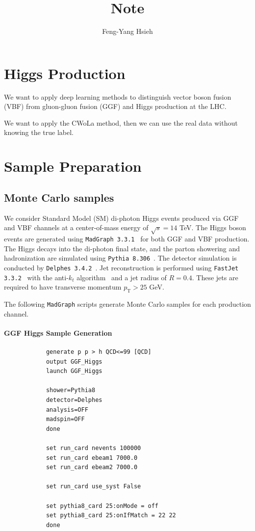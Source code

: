 \documentclass[12pt]{article}
\title{Note}
\author{Feng-Yang Hsieh}
\date{}
\begin{document}
\maketitle

\section{Higgs Production}%
\label{sec:higgs_production}
    We want to apply deep learning methods to distinguish vector boson fusion (VBF) from gluon-gluon fusion (GGF) and Higgs production at the LHC.

    We want to apply the CWoLa method, then we can use the real data without knowing the true label.
\section{Sample Preparation}%
\label{sec:sample_preparation}
    \subsection{Monte Carlo samples}%
    \label{sub:monte_carlo_samples}
        We consider Standard Model (SM) di-photon Higgs events produced via GGF and VBF channels at a center-of-mass energy of $\sqrt{s} = 14$ TeV. The Higgs boson events are generated using \verb|MadGraph 3.3.1|~\cite{Alwall:2014hca} for both GGF and VBF production. The Higgs decays into the di-photon final state, and the parton showering and hadronization are simulated using \verb|Pythia 8.306|~\cite{Sjostrand:2014zea}. The detector simulation is conducted by \verb|Delphes 3.4.2|~\cite{deFavereau:2013fsa}. Jet reconstruction is performed using \verb|FastJet 3.3.2|~\cite{Cacciari:2011ma} with the anti-$k_t$ algorithm~\cite{Cacciari:2008gp} and a jet radius of $R = 0.4$. These jets are required to have transverse momentum $p_{\text{T}} > 25$ GeV.

        The following \verb|MadGraph| scripts generate Monte Carlo samples for each production channel.
        \paragraph{GGF Higgs Sample Generation}
        \begin{lstlisting}
            generate p p > h QCD<=99 [QCD]
            output GGF_Higgs
            launch GGF_Higgs

            shower=Pythia8
            detector=Delphes
            analysis=OFF
            madspin=OFF
            done

            set run_card nevents 100000
            set run_card ebeam1 7000.0
            set run_card ebeam2 7000.0

            set run_card use_syst False

            set pythia8_card 25:onMode = off
            set pythia8_card 25:onIfMatch = 22 22
            done
        \end{lstlisting}
\end{document}
